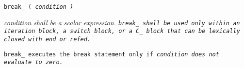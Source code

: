 
\tt{break_ (} \it{condition} \tt{)}


\it{condition} shall be a scalar expression.
\tt{break_} shall be used only within an iteration block, a switch block,
or a C\_ block that can be lexically closed with \tt{end} or \tt{refed}.


\tt{break_} executes the \tt{break} statement
only if \it{condition} does not evaluate to zero.
